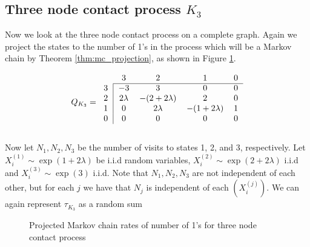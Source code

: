 \subsection{Three node contact process \texorpdfstring{$K_3$}{K3}}
Now we look at the three node contact process on a complete graph.
Again we project the states to the number of 1's in the process which will be a Markov chain by Theorem \ref{thm:mc_projection}, as shown in Figure \ref{fig:mc_three_contact}.

\begin{equation}
Q_{K_3} = \begin{blockarray}{ccccc}
    & 3 & 2 & 1 & 0\\
    \begin{block}{c|cccc}
    \cline{2-5}
        3 & -3 & 3 & 0 & 0 \\
        2 & 2\lambda & -(2 + 2 \lambda) &
        2 & 0\\
        1 & 0 & 2\lambda & -(1 + 2\lambda) & 1\\
    0 & 0 & 0 & 0 & 0\\
    \end{block}
\end{blockarray}
\end{equation}

Now let $N_1, N_2, N_3$ be the number of visits to states 1, 2, and 3, respectively.
Let $X_i^{(1)} \sim \exp(1 + 2\lambda)$ be i.i.d random variables, $X_i^{(2)} \sim \exp(2 + 2\lambda)$ i.i.d and $X_i^{(3)} \sim \exp(3)$ i.i.d.
Note that $N_1, N_2, N_3$ are not independent of each other, but for each $j$ we have that $N_j$ is independent of each $(X_i^{(j)})$.
We can again represent $\tau_{K_3}$ as a random sum

\begin{figure}[H]
    \centering
    \caption{Projected Markov chain rates of number of 1's for three node contact process}
    \label{fig:mc_three_contact}
\end{figure}

